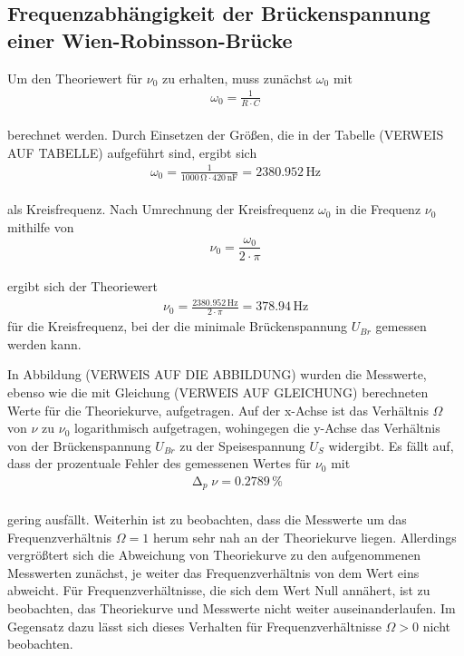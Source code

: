 \subsection{Frequenzabhängigkeit der Brückenspannung einer Wien-Robinsson-Brücke}

Um den Theoriewert für $\nu_{0}$ zu erhalten, muss zunächst $\omega_{0}$ mit 
\begin{align}
\omega_{0} = \frac{1}{R \cdot C} \nonumber
\end{align}
\\ 
berechnet werden. Durch Einsetzen der Größen, die in der Tabelle (VERWEIS AUF TABELLE) 
aufgeführt sind, ergibt sich
\begin{align}
\omega_{0} = \frac{1}{1000\, \si{\ohm} \cdot 420\, \si{\nano\farad}} = 2380.952\, \si{\hertz}
\end{align}
\\ 
als Kreisfrequenz. Nach Umrechnung der Kreisfrequenz $\omega_{0}$ in die Frequenz $\nu_{0}$ mithilfe von 
\begin{equation}
\nu_{0} = \frac{\omega_{0}}{2 \cdot \pi}
\end{equation}
\\
ergibt sich der Theoriewert 
\begin{align}
\nu_{0} = \frac{2380.952\, \si{\hertz}}{2 \cdot \pi} = 378.94\, \si{\hertz}
\end{align}
für die Kreisfrequenz, bei der die minimale Brückenspannung $U_{Br}$ gemessen werden kann.

In Abbildung (VERWEIS AUF DIE ABBILDUNG) wurden die Messwerte, ebenso wie die mit Gleichung (VERWEIS AUF GLEICHUNG) 
berechneten Werte für die Theoriekurve, aufgetragen. Auf der x-Achse ist das Verhältnis $\Omega$ von $\nu$ zu $\nu_{0}$
logarithmisch aufgetragen, wohingegen die y-Achse das Verhältnis von der Brückenspannung $U_{Br}$ zu der Speisespannung
$U_{S}$ widergibt.
Es fällt auf, dass der prozentuale Fehler des gemessenen Wertes für $\nu_{0}$ mit 
\begin{align}
\upDelta_{p} \nu = 0.2789\, \% \nonumber
\end{align}
\\
gering ausfällt. Weiterhin ist zu beobachten, dass die Messwerte um das Frequenzverhältnis $\Omega = 1$
herum sehr nah an der Theoriekurve liegen. Allerdings vergrößtert sich die Abweichung von Theoriekurve zu den aufgenommenen
Messwerten zunächst, je weiter das Frequenzverhältnis von dem Wert eins abweicht. Für Frequenzverhältnisse, die sich dem Wert Null
annähert, ist zu beobachten, das Theoriekurve und Messwerte nicht weiter auseinanderlaufen. Im Gegensatz dazu lässt sich 
dieses Verhalten für Frequenzverhältnisse $\Omega > 0$ nicht beobachten.


